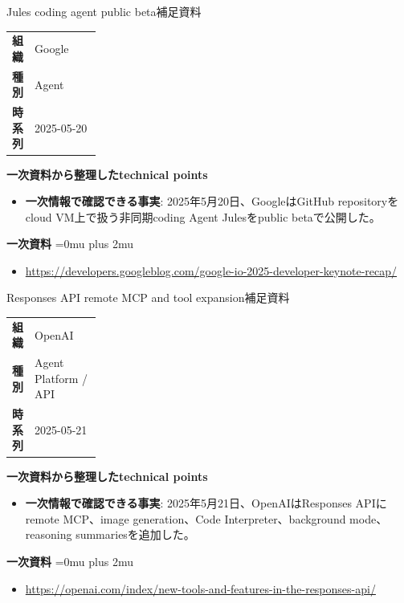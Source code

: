 \begin{technicalnote}{Jules coding agent public beta}{補足資料}
\begingroup
\begin{tabularx}{\linewidth}{@{}>{\bfseries}p{0.22\linewidth}X@{}}
組織 & Google \\
種別 & Agent \\
時系列 & 2025-05-20 \\
\end{tabularx}
\smallskip
{\bfseries 一次資料から整理したtechnical points}
\begin{itemize}[leftmargin=1.5em,itemsep=0.35em]
\item \textbf{一次情報で確認できる事実}: 2025年5月20日、GoogleはGitHub repositoryをcloud VM上で扱う非同期coding Agent Julesをpublic betaで公開した。
\end{itemize}
\begin{samepage}
{\bfseries 一次資料}
\begingroup\sloppy
\Urlmuskip=0mu plus 2mu\relax
\begin{itemize}[leftmargin=1.5em,itemsep=0.25em]
\item {\scriptsize\url{https://developers.googleblog.com/google-io-2025-developer-keynote-recap/}}
\end{itemize}
\endgroup
\end{samepage}
\endgroup
\end{technicalnote}
\medskip

\begin{technicalnote}{Responses API remote MCP and tool expansion}{補足資料}
\begingroup
\begin{tabularx}{\linewidth}{@{}>{\bfseries}p{0.22\linewidth}X@{}}
組織 & OpenAI \\
種別 & Agent Platform / API \\
時系列 & 2025-05-21 \\
\end{tabularx}
\smallskip
{\bfseries 一次資料から整理したtechnical points}
\begin{itemize}[leftmargin=1.5em,itemsep=0.35em]
\item \textbf{一次情報で確認できる事実}: 2025年5月21日、OpenAIはResponses APIにremote MCP、image generation、Code Interpreter、background mode、reasoning summariesを追加した。
\end{itemize}
\begin{samepage}
{\bfseries 一次資料}
\begingroup\sloppy
\Urlmuskip=0mu plus 2mu\relax
\begin{itemize}[leftmargin=1.5em,itemsep=0.25em]
\item {\scriptsize\url{https://openai.com/index/new-tools-and-features-in-the-responses-api/}}
\end{itemize}
\endgroup
\end{samepage}
\endgroup
\end{technicalnote}
\medskip

